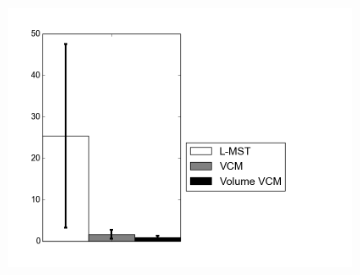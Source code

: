\documentclass{beamer}
\begin{document}
\begin{frame}
\begin{figure}[h]
\begin{subfigure}[t]{0.5\textwidth}
			\label{fig:noisycylinder}
		\end{subfigure}%
		\begin{subfigure}[t]{0.5\textwidth}
			\centering
			\includegraphics[width=1\textwidth, clip, trim=0.5cm 1cm 3cm 0.5cm]{fig/angle_defect.png}
			\label{fig:angledefect}
		\end{subfigure}
				
	\end{figure}
\end{frame}
\end{document}
